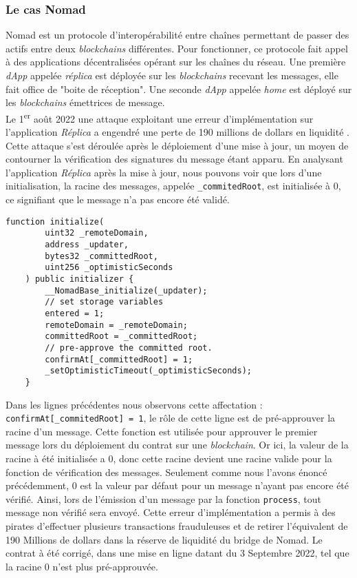 \subsubsection{Le cas Nomad}
\gls{Nomad} est un protocole d'interopérabilité entre chaînes permettant de passer des \gls{actif}s entre deux \textit{\gls{blockchain}s} différentes. 
Pour fonctionner, ce protocole fait appel à des applications décentralisées opérant sur les chaînes du réseau. 
Une première \textit{\gls{dApp}} appelée \textit{réplica} est déployée sur les \textit{\gls{blockchain}s} recevant les messages, elle fait office de "boite de réception". 
Une seconde \textit{\gls{dApp}} appelée \textit{home} est déployé sur les \textit{\gls{blockchain}s} émettrices de message. \\
Le 1\textsuperscript{er} août 2022 une attaque exploitant une erreur d'implémentation sur l'application \textit{Réplica} a engendré une perte de 190 millions de dollars en liquidité \cite{NomadMedium} \cite{NomadRekt}.
Cette attaque s'est déroulée après le déploiement d'une mise à jour, un moyen de contourner la vérification des signatures du message étant apparu. 
En analysant l'application \textit{Réplica} après la mise à jour, nous pouvons voir que lors d'une initialisation, la racine des messages, appelée \texttt{\_commitedRoot}, est initialisée à $0$, ce signifiant que le message n'a pas encore été validé. 
\begin{lstlisting}[caption={Fonction \textit{initialize} de \textit{Réplica} contenant une erreur \cite{NomadGitError}}]
    function initialize(
        uint32 _remoteDomain,
        address _updater,
        bytes32 _committedRoot,
        uint256 _optimisticSeconds
    ) public initializer {
        __NomadBase_initialize(_updater);
        // set storage variables
        entered = 1;
        remoteDomain = _remoteDomain;
        committedRoot = _committedRoot;
        // pre-approve the committed root.
        confirmAt[_committedRoot] = 1;
        _setOptimisticTimeout(_optimisticSeconds);
    }
\end{lstlisting}

Dans les lignes précédentes nous observons cette affectation : \texttt{confirmAt[\_commitedRoot] = 1}, le rôle de cette ligne est de pré-approuver la racine d'un message. 
Cette fonction est utilisée pour approuver le premier message lors du déploiement du contrat sur une \textit{\gls{blockchain}}. 
Or ici, la valeur de la racine à été initialisée a $0$, donc cette racine devient une racine valide pour la fonction de vérification des messages. 
Seulement comme nous l'avons énoncé précédemment, $0$ est la valeur par défaut pour un message n'ayant pas encore été vérifié. 
Ainsi, lors de l'émission d'un message par la fonction \texttt{process}, tout message non vérifié sera envoyé. 
Cette erreur d'implémentation a permis à des pirates d'effectuer plusieurs transactions frauduleuses et de retirer l'équivalent de 190 Millions de dollars dans la réserve de liquidité du bridge de \gls{Nomad}. 
Le contrat à été corrigé, dans une mise en ligne datant du 3 Septembre 2022, tel que la racine $0$ n'est plus pré-approuvée. 

